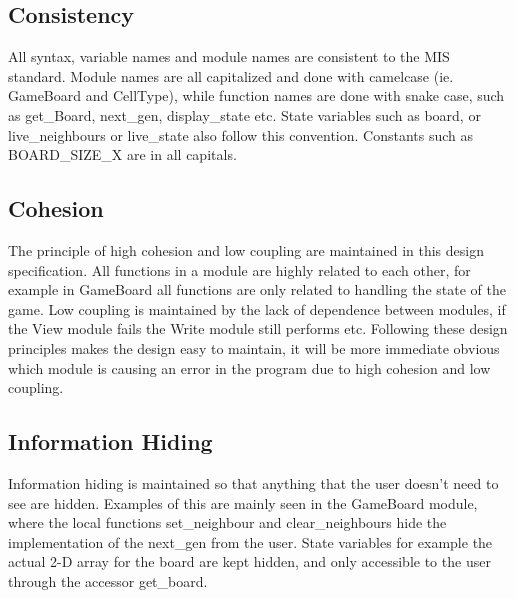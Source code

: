 \documentclass[12pt]{article}
\begin{document}
\subsection{Consistency}

All syntax, variable names and module names are consistent to the MIS standard. Module names are all capitalized and done with camelcase (ie. GameBoard and CellType), while function names are done with snake case, such as get\_Board, next\_gen, display\_state etc. State variables such as board, or live\_neighbours or live\_state also follow this convention. Constants such as BOARD\_SIZE\_X are in all capitals.

\subsection{Cohesion}

The principle of high cohesion and low coupling are maintained in this design specification. All functions in a module are highly related to each other, for example in GameBoard all functions are only related to handling the state of the game. Low coupling is maintained by the lack of dependence between modules, if the View module fails the Write module still performs etc. Following these design principles makes the design easy to maintain, it will be more immediate obvious which module is causing an error in the program due to high cohesion and low coupling. 

\subsection{Information Hiding}

Information hiding is maintained so that anything that the user doesn't need to see are hidden. Examples of this are mainly seen in the GameBoard module, where the local functions set\_neighbour and clear\_neighbours hide the implementation of the next\_gen from the user. State variables for example the actual 2-D array for the board are kept hidden, and only accessible to the user through the accessor get\_board.
\end{document}
